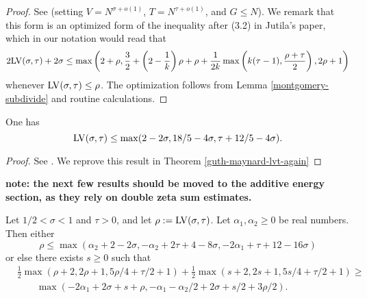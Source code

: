\literature
{}

\begin{proof} See \cite[(1.4)]{jutila_zero_density_1977} (setting $V = N^{\sigma+o(1)}$, $T = N^{\tau+o(1)}$, and $G \leq N$).  We remark that this form is an optimized form of the inequality after (3.2) in Jutila's paper, which in our notation would read that
$$ 2\mathrm{LV}(\sigma,\tau) + 2\sigma \leq \max \left(2 + \rho, \frac{3}{2} + \left(2 - \frac{1}{k}\right)\rho + \rho + \frac{1}{2k}\max\left(k(\tau-1), \frac{\rho+\tau}{2}\right), 2\rho + 1\right)$$
whenever $\mathrm{LV}(\sigma,\tau) \leq \rho$.  The optimization follows from Lemma \ref{montgomery-subdivide} and routine calculations.
\end{proof}

\begin{theorem}\label{guth-maynard-lvt} One has
$$ \mathrm{LV}(\sigma,\tau) \leq \max(2-2\sigma, 18/5 - 4 \sigma, \tau + 12/5 - 4\sigma).$$
\end{theorem}

\literature
{}

\begin{proof}
See \cite[Theorem~1.1]{guth-maynard}. We reprove this result in Theorem \ref{guth-maynard-lvt-again}
\end{proof}

{\bf note: the next few results should be moved to the additive energy section, as they rely on double zeta sum estimates.}

\begin{theorem}\label{bourgain-lvt} \cite{bourgain_large_2000} Let $1/2 < \sigma < 1$ and $\tau > 0$, and let $\rho := \mathrm{LV}(\sigma,\tau)$.  Let $\alpha_1, \alpha_2 \geq 0$ be real numbers.  Then either
\begin{equation}\label{rho1}
 \rho \leq \max( \alpha_2 + 2 - 2 \sigma, -\alpha_2 + 2\tau+4-8\sigma, -2\alpha_1 + \tau + 12 - 16 \sigma)
\end{equation}
or else there exists $s \geq 0$ such that
\begin{equation}\label{rs}
\begin{split}
     &\frac{1}{2}\max(\rho+2, 2\rho+1, 5\rho/4 + \tau/2 + 1) + \frac{1}{2}\max(s+2, 2s+1, 5s/4 + \tau/2 + 1) \geq \\
		&\qquad\max( -2\alpha_1 + 2\sigma + s + \rho, -\alpha_1 - \alpha_2/2 + 2\sigma + s/2 + 3\rho/2).
\end{split}
\end{equation}
\end{theorem}

